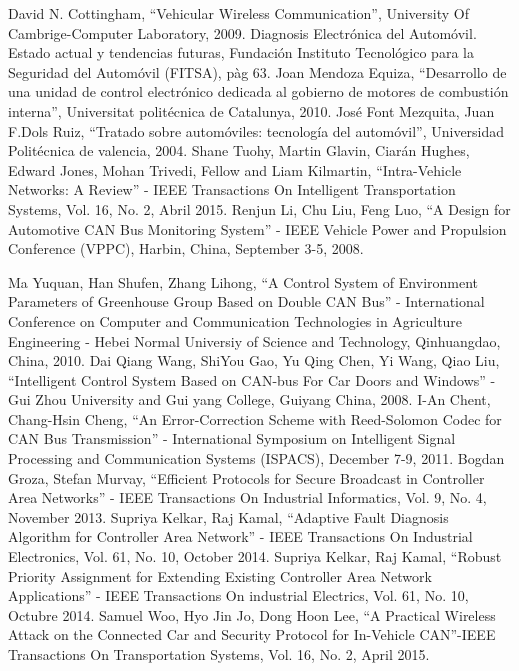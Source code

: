 \begin{thebibliography}{99}


 David N. Cottingham, “Vehicular Wireless Communication”, University Of Cambrige-Computer Laboratory, 2009.
 Diagnosis Electrónica del Automóvil. Estado actual y tendencias futuras, Fundación Instituto Tecnológico para la Seguridad del Automóvil (FITSA), pàg 63.
 Joan Mendoza Equiza, “Desarrollo de una unidad de control electrónico dedicada al gobierno de motores de combustión interna”, Universitat politécnica de Catalunya, 2010.
 José Font Mezquita, Juan F.Dols Ruiz, “Tratado sobre automóviles: tecnología del automóvil”, Universidad Politécnica de valencia, 2004.
 Shane Tuohy, Martin Glavin, Ciarán Hughes, Edward Jones, Mohan Trivedi, Fellow  and Liam Kilmartin, “Intra-Vehicle Networks: A Review” - IEEE Transactions On Intelligent Transportation Systems, Vol. 16, No. 2, Abril 2015.
 Renjun Li, Chu Liu, Feng Luo, “A Design for Automotive CAN Bus Monitoring System” - IEEE Vehicle Power and Propulsion Conference (VPPC), Harbin, China, September 3-5, 2008.

 Ma Yuquan, Han Shufen, Zhang Lihong, “A Control System of Environment Parameters of Greenhouse Group Based on Double CAN Bus” - International Conference on Computer and Communication Technologies in Agriculture Engineering  - Hebei Normal Universiy of Science and Technology, Qinhuangdao, China, 2010. %
 Dai Qiang Wang, ShiYou Gao, Yu Qing Chen,  Yi Wang,  Qiao Liu, “Intelligent Control System Based on CAN-bus For Car Doors and Windows” - Gui Zhou University and Gui yang College, Guiyang China, 2008.
 I-An Chent, Chang-Hsin Cheng,  “An Error-Correction Scheme with Reed-Solomon Codec for CAN Bus Transmission” - International Symposium on Intelligent Signal Processing and Communication Systems (ISPACS), December 7-9, 2011.
 Bogdan Groza, Stefan Murvay, “Efficient Protocols for Secure Broadcast in Controller Area Networks” - IEEE Transactions On Industrial Informatics, Vol. 9, No. 4, November 2013. 
 Supriya Kelkar, Raj Kamal, “Adaptive Fault Diagnosis Algorithm for Controller Area Network” - IEEE Transactions On Industrial Electronics, Vol. 61, No. 10, October 2014. 
 Supriya Kelkar,  Raj Kamal, “Robust Priority Assignment for Extending Existing Controller Area Network  Applications” - IEEE Transactions On industrial Electrics, Vol. 61, No. 10, Octubre 2014.
 Samuel Woo, Hyo Jin Jo,  Dong Hoon Lee, “A Practical Wireless Attack on the Connected Car and Security Protocol for In-Vehicle CAN”-IEEE Transactions On Transportation Systems, Vol. 16, No. 2, April 2015.


\end{thebibliography}
